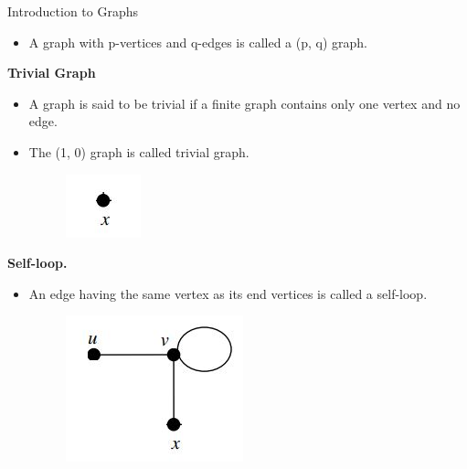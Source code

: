 \documentclass{beamer}
\begin{document}
\begin{frame}{Introduction to Graphs}
	\begin{itemize}
		\item A graph with p-vertices and q-edges is called a (p, q) graph.
	\end{itemize}
	\textbf{Trivial Graph}
	\begin{itemize}
		\item A graph is said to be trivial if a finite graph contains only one vertex and no edge.
		\item The (1, 0) graph is called trivial graph. 
		\begin{figure}
			\includegraphics[scale=.5]{img/m3}
		\end{figure}
	\end{itemize}
	\textbf{Self-loop.}
	\begin{itemize}
		\item An edge having the same vertex as its end vertices is called a self-loop.
		\begin{figure}
			\includegraphics[scale=.5]{img/m2}
		\end{figure}
	\end{itemize}
\end{frame}
\end{document}
